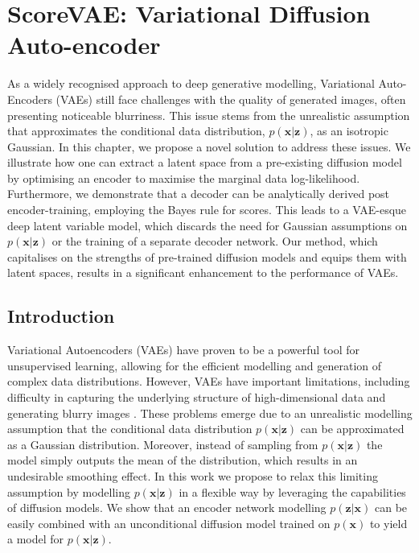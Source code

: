 \chapter{ScoreVAE: Variational Diffusion Auto-encoder}\label{Chapter:ScoreVAE}

\ifpdf
    \graphicspath{{Chapter3/Figs/Raster/}{Chapter3/Figs/PDF/}{Chapter3/Figs/}}
\else
    \graphicspath{{Chapter3/Figs/Vector/}{Chapter3/Figs/}}
\fi

As a widely recognised approach to deep generative modelling, Variational Auto-Encoders (VAEs) still face challenges with the quality of generated images, often presenting noticeable blurriness. This issue stems from the unrealistic assumption that approximates the conditional data distribution, $p(\textbf{x} | \textbf{z})$, as an isotropic Gaussian. In this chapter, we propose a novel solution to address these issues. We illustrate how one can extract a latent space from a pre-existing diffusion model by optimising an encoder to maximise the marginal data log-likelihood. Furthermore, we demonstrate that a decoder can be analytically derived post encoder-training, employing the Bayes rule for scores. This leads to a VAE-esque deep latent variable model, which discards the need for Gaussian assumptions on $p(\textbf{x} | \textbf{z})$ or the training of a separate decoder network. Our method, which capitalises on the strengths of pre-trained diffusion models and equips them with latent spaces, results in a significant enhancement to the performance of VAEs.

\section{Introduction}
Variational Autoencoders (VAEs) \cite{vae} have proven to be a powerful tool for unsupervised learning, allowing for the efficient modelling and generation of complex data distributions. However, VAEs have important limitations, including difficulty in capturing the underlying structure of high-dimensional data and generating blurry images \cite{zaho2017understanding_vaes}. These problems emerge due to an unrealistic modelling assumption that the conditional data distribution $p(\textbf{x}| \textbf{z})$ can be approximated as a Gaussian distribution. Moreover, instead of sampling from $p(\textbf{x}| \textbf{z})$ the model simply outputs the mean of the distribution, which results in an undesirable smoothing effect. In this work we propose to relax this limiting assumption by modelling $p(\textbf{x}| \textbf{z})$ in a flexible way by leveraging the capabilities of diffusion models. We show that an encoder network modelling $p( \textbf{z} | \textbf{x})$ can be easily combined with an unconditional diffusion model trained on $p(\textbf{x})$ to yield a model for $p(\textbf{x} | \textbf{z})$.

